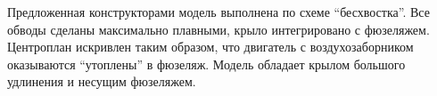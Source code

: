 Предложенная конструкторами модель выполнена по схеме ``бесхвостка''. Все обводы сделаны максимально плавными, крыло интегрировано с фюзеляжем. Центроплан искривлен таким образом, что двигатель с воздухозаборником оказываются ``утоплены'' в фюзеляж. Модель обладает крылом большого удлинения и несущим фюзеляжем. 